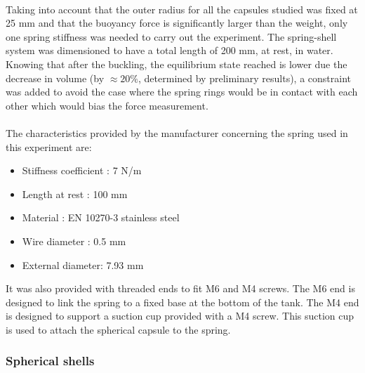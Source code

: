 \paragraph{}
Taking into account that the outer radius for all the capsules studied was fixed at 25 mm and that the buoyancy force is significantly larger than the weight, only one spring stiffness was needed to carry out the experiment.
The spring-shell system was dimensioned to have a total length of 200 mm, at rest, in water. Knowing that after the buckling, the equilibrium state reached is lower due the decrease in volume (by $\approx 20\%$, determined by preliminary results), a constraint was added to avoid the case where the spring rings would be in contact with each other which would bias the force measurement.
\paragraph{}
The characteristics provided by the manufacturer concerning the spring used in this experiment are:
\
\begin{itemize}
	\item Stiffness coefficient : 7 N/m
	\item Length at rest : 100 mm 
	\item Material : EN 10270-3 stainless steel
	\item Wire diameter : 0.5 mm
	\item External diameter: 7.93 mm
\end{itemize}

It was also provided with threaded ends to fit M6 and M4 screws. The M6 end is designed to link the spring to a fixed base at the bottom of the tank. The M4 end is designed to support a suction cup provided with a M4 screw. This suction cup is used to attach the spherical capsule to the spring.


\subsubsection{Spherical shells}
\label{sec:Spherical_shells}
